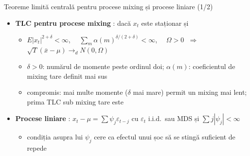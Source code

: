 \begin{frame}{Teoreme limită centrală pentru procese mixing și procese liniare (1/2)}
\itemsize{\small}
\begin{itemize}
    \item \textbf{TLC pentru procese mixing} : dacă $x_t$ este staționar și
    \begin{itemize}
        \item $E|x_t|^{2+\delta} < \infty$, $\quad \sum_m \alpha(m)^{\delta/(2+\delta)} < \infty$, $\quad \Omega > 0$ $\;\Rightarrow\;$ $\sqrt{T}(\bar x - \mu) \to_d N(0, \Omega)$
        \item $\delta > 0$: numărul de momente peste ordinul doi; $\alpha(m)$: coeficientul de mixing tare definit mai sus
        \item compromis: mai multe momente ($\delta$ mai mare) permit un mixing mai lent; prima TLC sub mixing tare este 
    \end{itemize}
    \item \textbf{Procese liniare} : $x_t - \mu = \sum\psi_j\varepsilon_{t-j}$ cu $\varepsilon_t$ i.i.d.\ sau MDS și $\sum j|\psi_j| < \infty$
    \begin{itemize}
        \item condiția asupra lui $\psi_j$ cere ca efectul unui șoc să se stingă suficient de repede
    \end{itemize}
\end{itemize}
\end{frame}

